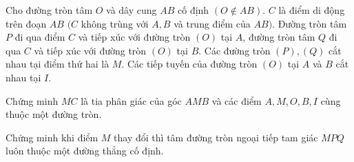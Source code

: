\begin{ex}%
Cho đường tròn tâm $O$ và dây cung $AB$ cố định $\left( O \notin AB\right)$. $C$ là điểm di động trên đoạn $AB$ $ (C$ không trùng với $A, B$ và trung điểm của $AB)$. Đường tròn tâm $P$ đi qua điểm $C$ và tiếp xúc với đường tròn $(O)$ tại $A$, đường tròn tâm $Q$ đi qua $C$ và tiếp xúc với đường tròn $(O)$ tại $B$. Các đường tròn $(P), (Q)$ cắt nhau tại điểm thứ hai là $M$. Các tiếp tuyến của đường tròn $(O)$ tại $A$ và $B$ cắt nhau tại $I$.
\begin{listEX}
	\item Chứng minh $MC$ là tia phân giác của góc $AMB$ và các điểm $A, M, O, B, I$ cùng thuộc một đường tròn.
	\item Chứng minh khi điểm $M$ thay đổi thì tâm đường tròn ngoại tiếp tam giác $MPQ$ luôn thuộc một đường thẳng cố định.
\end{listEX}
\end{ex}
